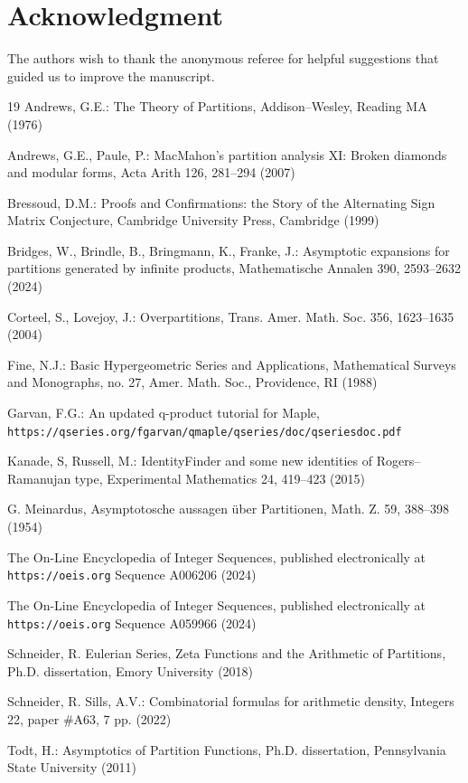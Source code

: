 \documentclass[10pt]{article}
\theoremstyle{definition}
\numberwithin{theorem}{section}
\numberwithin{equation}{section}
\begin{document}
\section*{Acknowledgment}
The authors wish to thank the anonymous referee for helpful suggestions that guided us to
improve the manuscript.




  \begin{thebibliography}{19}
   Andrews, G.E.: The Theory of Partitions, Addison--Wesley, Reading MA (1976)
 
   Andrews, G.E., Paule, P.: MacMahon's partition analysis XI: Broken
  diamonds and modular forms, Acta Arith 126, 281--294 (2007)

   Bressoud, D.M.: Proofs and Confirmations: the Story of the Alternating
  Sign Matrix Conjecture, Cambridge University Press, Cambridge (1999)
  
   Bridges, W., Brindle, B.,  Bringmann, K., Franke, J.:
  Asymptotic expansions for partitions generated by infinite products,
 {Mathematische Annalen} 390, 2593--2632 (2024)
 
  Corteel, S., Lovejoy, J.: Overpartitions, Trans. Amer. Math. Soc. 356, 1623--1635
 (2004)

   Fine, N.J.: Basic Hypergeometric Series and Applications, 
  Mathematical Surveys and Monographs, no. 27, Amer. Math. Soc., Providence, RI (1988)
  
   Garvan, F.G.:  An updated q-product tutorial for Maple,
  \texttt{https://qseries.org/fgarvan/qmaple/qseries/doc/qseriesdoc.pdf}
 
   Kanade, S, Russell, M.: 
  IdentityFinder and some new identities of Rogers--Ramanujan type,
  Experimental Mathematics 24, 419--423 (2015)

   G. Meinardus, Asymptotosche aussagen \"{u}ber Partitionen, Math. Z. 
  59, 388–398 (1954)

   The On-Line Encyclopedia of Integer Sequences, published electronically at \texttt{https://oeis.org} Sequence A006206 (2024)

   The On-Line Encyclopedia of Integer Sequences, published electronically at \texttt{https://oeis.org} Sequence A059966 (2024)


 Schneider, R. {Eulerian Series, 
Zeta Functions and the Arithmetic of Partitions}, Ph.D. dissertation, Emory University (2018)

 
 Schneider, R. Sills, A.V.: Combinatorial formulas for arithmetic
  density,  Integers 22,  paper \#A63,  7 pp. (2022)
  
  Todt, H.: {Asymptotics of Partition Functions}, Ph.D. dissertation, Pennsylvania State 
 University (2011) 
  
\end{thebibliography}
  
\end{document}
